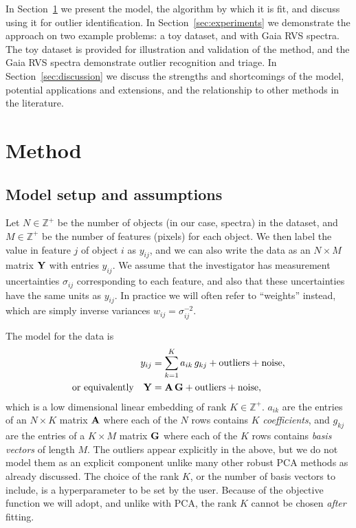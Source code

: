 \documentclass[onecolumn,floatfix,linenumbers,trackchanges]{aastex631}
\begin{document}
In Section~\ref{sec:methods} we present the model, the algorithm by which it is fit, and discuss using it for outlier identification. 
In Section~\ref{sec:experiments} we demonstrate the approach on two example problems: a toy dataset, and with Gaia RVS spectra. 
The toy dataset is provided for illustration and validation of the method, and the Gaia RVS spectra demonstrate outlier recognition and triage. 
In Section~\ref{sec:discussion} we discuss the strengths and shortcomings of the model, potential applications and extensions, and the relationship to other methods in the literature. 

\section{Method} \label{sec:methods}


\subsection{Model setup and assumptions} \label{sec:assumptions}

Let $N \in \mathbb{Z}^+$ be the number of objects (in our case, spectra) in the dataset, and $M\in\mathbb{Z}^+$ be the number of features (pixels) for each object.
We then label the value in feature $j$ of object $i$ as $y_{ij}$, and we can also write the data as an $N \times M$ matrix ${\bf Y}$ with entries $y_{ij}$.
We assume that the investigator has measurement uncertainties $\sigma_{ij}$ corresponding to each feature, and also that these uncertainties have the same units as $y_{ij}$.
In practice we will often refer to ``weights'' instead, which are simply inverse variances $w_{ij} = \sigma_{ij}^{-2}$.

The model for the data is
\begin{align}
    y_{ij} &= \sum_{k=1}^K a_{ik}\,g_{kj} + \rm{outliers} + \rm{noise}, \\
    \rm{or \,\, equivalently} \quad {\bf Y} &= {\bf A}\,{\bf G} + \rm{outliers} + \rm{noise}, \label{eq:model}
\end{align}
which is a low dimensional linear embedding of rank $K\in\mathbb{Z}^+$.
$a_{ik}$ are the entries of an $N \times K$ matrix ${\bf A}$ where each of the $N$ rows contains $K$ \emph{coefficients}, and $g_{kj}$ are the entries of a $K \times M$ matrix ${\bf G}$ where each of the $K$ rows contains \emph{basis vectors} of length $M$.
The outliers appear explicitly in the above, but we do not model them as an explicit component unlike many other robust PCA methods as already discussed.
The choice of the rank $K$, or the number of basis vectors to include, is a hyperparameter to be set by the user.
Because of the objective function we will adopt, and unlike with PCA, the rank $K$ cannot be chosen \emph{after} fitting.
\end{document}
